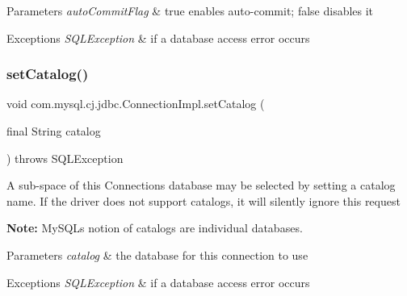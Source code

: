 \begin{DoxyParams}{Parameters}
{\em auto\+Commit\+Flag} & true enables auto-\/commit; false disables it \\
\hline
\end{DoxyParams}

\begin{DoxyExceptions}{Exceptions}
{\em S\+Q\+L\+Exception} & if a database access error occurs \\
\hline
\end{DoxyExceptions}
\mbox{\label{classcom_1_1mysql_1_1cj_1_1jdbc_1_1_connection_impl_aa496cdf7782256493c7bddd156d9b75d}} 
\subsubsection{\texorpdfstring{set\+Catalog()}{setCatalog()}}
{\footnotesize\ttfamily void com.\+mysql.\+cj.\+jdbc.\+Connection\+Impl.\+set\+Catalog (\begin{DoxyParamCaption}\item[{final String}]{catalog }\end{DoxyParamCaption}) throws S\+Q\+L\+Exception}

A sub-\/space of this Connection\textquotesingle{}s database may be selected by setting a catalog name. If the driver does not support catalogs, it will silently ignore this request 

{\bfseries Note\+:} My\+S\+QL\textquotesingle{}s notion of catalogs are individual databases. 


\begin{DoxyParams}{Parameters}
{\em catalog} & the database for this connection to use \\
\hline
\end{DoxyParams}

\begin{DoxyExceptions}{Exceptions}
{\em S\+Q\+L\+Exception} & if a database access error occurs \\
\hline
\end{DoxyExceptions}
\mbox{\label{classcom_1_1mysql_1_1cj_1_1jdbc_1_1_connection_impl_a90d865f0fb40db6d40a5b7d277d9dc1b}} 
